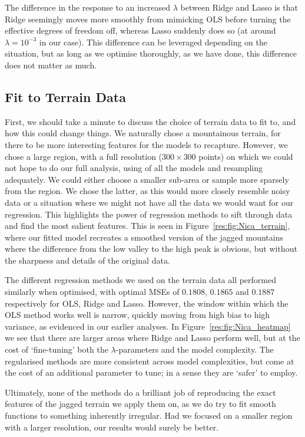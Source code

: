 \documentclass[twocolumn,english,notitlepage]{article}
\begin{document}
            The difference in the response to an increased $\lambda$ between Ridge and Lasso is that Ridge seemingly moves more smoothly from mimicking OLS before turning the effective degrees of freedom off, whereas Lasso suddenly does so (at around $\lambda=10^{-3}$ in our case). This difference can be leveraged depending on the situation, but as long as we optimise thoroughly, as we have done, this difference does not matter as much.


    \subsection{Fit to Terrain Data}
        First, we should take a minute to discuss the choice of terrain data to fit to, and how this could change things. We naturally chose a mountainous terrain, for there to be more interesting features for the models to recapture. However, we chose a large region, with a full resolution ($300\times 300$ points) on which we could not hope to do our full analysis, using of all the models and resampling adequately. We could either choose a smaller sub-area or sample more sparsely from the region. We chose the latter, as this would more closely resemble noisy data or a situation where we might not have all the data we would want for our regression. This highlights the power of regression methods to sift through data and find the most salient features. This is seen in Figure~\ref{res:fig:Nica_terrain}, where our fitted model recreates a smoothed version of the jagged mountains where the difference from the low valley to the high peak is obvious, but without the sharpness and details of the original data.

        The different regression methods we used on the terrain data all performed similarly when optimised, with optimal MSEs of $0.1808$, $0.1865$ and $0.1887$ respectively for OLS, Ridge and Lasso. However, the window within which the OLS method works well is narrow, quickly moving from high bias to high variance, as evidenced in our earlier analyses. In Figure~\ref{res:fig:Nica_heatmap} we see that there are larger areas where Ridge and Lasso perform well, but at the cost of `fine-tuning' both the $\lambda$-parameters and the model complexity. The regularised methods are more consistent across model complexities, but come at the cost of an additional parameter to tune; in a sense they are `safer' to employ.

        Ultimately, none of the methods do a brilliant job of reproducing the exact features of the jagged terrain we apply them on, as we do try to fit smooth functions to something inherently irregular. Had we focused on a smaller region with a larger resolution, our results would surely be better.
\end{document}
